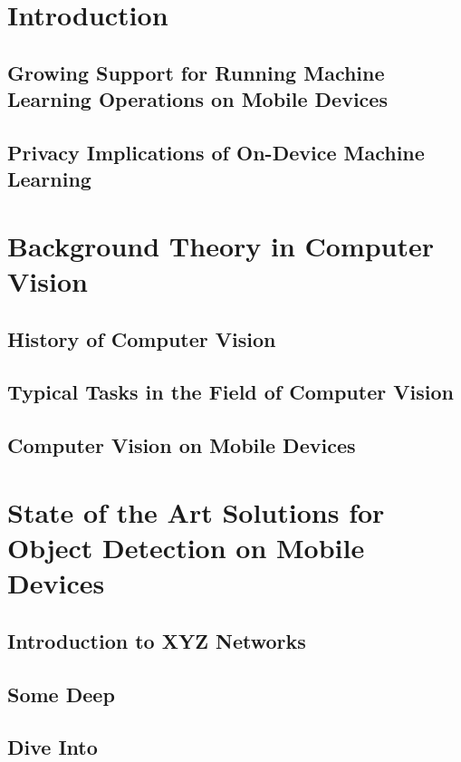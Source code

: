 \documentclass[11pt,
               a4paper,
               bibtotoc,
               idxtotoc,
               headsepline,
               footsepline,
               footexclude,
               BCOR12mm,
               DIV13,
               openany,   %
               ]
               {scrbook}
\begin{document}
\mainmatter
\chapter{Introduction}

\section{Growing Support for Running Machine Learning Operations on Mobile Devices}

\section{Privacy Implications of On-Device Machine Learning}

\chapter{Background Theory in Computer Vision}

\section{History of Computer Vision}

\section{Typical Tasks in the Field of Computer Vision}

\section{Computer Vision on Mobile Devices}

\chapter{State of the Art Solutions for Object Detection on Mobile Devices}

\section{Introduction to XYZ Networks}

\section{Some Deep}
\section{Dive Into}
\end{document}

